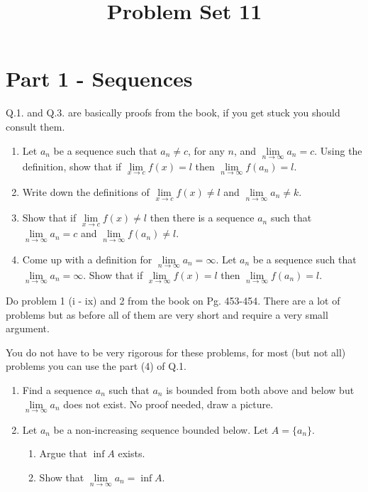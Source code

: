 \documentclass[9pt, a4paper, oneside, reqno]{amsart}
\title{Problem Set 11}
\begin{document}
\maketitle
\thispagestyle{fancy}


\section*{Part 1 - Sequences}
Q.1. and Q.3. are basically proofs from the book, if you get stuck you should consult them.
\begin{questions}
	\item
	\begin{enumerate}
		\item Let $ a_n$ be a sequence such that $ a_n \neq c$, for any $ n$, and $ \lim \limits_{n \rightarrow \infty} a_n = c$. Using the definition, show that if $ \lim \limits_{x \rightarrow c}f(x) = l$ then $ \lim \limits_{n \rightarrow \infty}f(a_n) = l$.
		\item Write down the definitions of $ \lim \limits_{x \rightarrow c}f(x) \not = l$ and $ \lim \limits_{n \rightarrow \infty}a_n \neq k$.
		\item Show that if $ \lim \limits_{x \rightarrow c}f(x) \not = l$ then there is a sequence $ a_n$ such that $ \lim \limits_{n \rightarrow \infty} a_n = c$ and $ \lim \limits_{n \rightarrow \infty}f(a_n) \neq l$.
		\item Come up with a definition for $ \lim \limits_{n\rightarrow \infty} a_n = \infty$. Let $ a_n$ be a sequence such that $ \lim \limits_{n \rightarrow \infty} a_n = \infty$. Show that if $ \lim \limits_{x \rightarrow \infty} f(x) = l$ then $ \lim \limits_{n \rightarrow \infty}f(a_n) = l$.
	\end{enumerate}


	\item Do problem 1 (i - ix) and 2 from the book on Pg. 453-454. There are a lot of problems but as before all of them are very short and require a very small argument.

	You do not have to be very rigorous for these problems, for most (but not all) problems you can use the part (4) of Q.1.


	\item
	\begin{enumerate}
		\item Find a sequence $ a_n$ such that $ a_n$ is bounded from both above and below but $ \lim \limits_{n \rightarrow \infty} a_n$ does not exist. No proof needed, draw a picture.
		\item Let $ a_n$ be a non-increasing sequence bounded below. Let $ A = \{ a_n \} $.
		      \begin{enumerate}
		      	\item Argue that $ \inf A$ exists.
		      	\item Show that $ \lim \limits_{n \rightarrow \infty} a_n = \inf A$.
		      \end{enumerate}
	\end{enumerate}


\end{questions}
\end{document}
